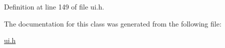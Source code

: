 Definition at line 149 of file ui.\+h.



The documentation for this class was generated from the following file\+:\begin{DoxyCompactItemize}
\item 
\hyperlink{ui_8h}{ui.\+h}\end{DoxyCompactItemize}
